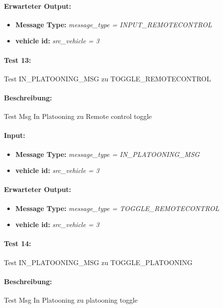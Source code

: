 \documentclass[a4paper, 12pt, titlepage]{scrartcl}
\begin{document}
{			\paragraph{Erwarteter Output:}
			\begin{itemize} \itemsep-0.5em
				\item \textbf{Message Type:} \emph{message\_type = INPUT\_REMOTECONTROL}
				\item \textbf{vehicle id:} \emph{src\_vehicle = 3}
			\end{itemize}				
			
			\paragraph{Test 13:}{Test IN\_PLATOONING\_MSG zu TOGGLE\_REMOTECONTROL}
			\paragraph{Beschreibung:} Test Msg In Platooning zu Remote control toggle
			\paragraph{Input:}
			\begin{itemize} \itemsep-0.5em
				\item \textbf{Message Type:} \emph{message\_type = IN\_PLATOONING\_MSG}
				\item \textbf{vehicle id:} \emph{src\_vehicle = 3}
			\end{itemize}
			\paragraph{Erwarteter Output:}
			\begin{itemize} \itemsep-0.5em
				\item \textbf{Message Type:} \emph{message\_type = TOGGLE\_REMOTECONTROL}
				\item \textbf{vehicle id:} \emph{src\_vehicle = 3}
			\end{itemize}
			
			\paragraph{Test 14:}{Test IN\_PLATOONING\_MSG zu TOGGLE\_PLATOONING}
			\paragraph{Beschreibung:} Test Msg In Platooning zu platooning toggle
}
\end{document}
